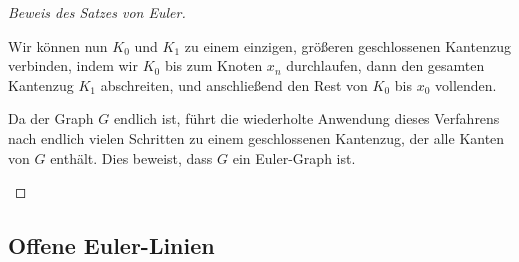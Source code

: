 \begin{proof}[Beweis des Satzes von Euler]
\begin{math-stroke}
Wir können nun $K_0$ und $K_1$ zu einem einzigen, größeren geschlossenen Kantenzug verbinden, indem wir $K_0$ bis zum Knoten $x_n$ durchlaufen, dann den gesamten Kantenzug $K_1$ abschreiten, und anschließend den Rest von $K_0$ bis $x_0$ vollenden.

\begin{center}
\end{center}

Da der Graph $G$ endlich ist, führt die wiederholte Anwendung dieses Verfahrens nach endlich vielen Schritten zu einem geschlossenen Kantenzug, der alle Kanten von $G$ enthält. Dies beweist, dass $G$ ein Euler-Graph ist.
\end{math-stroke}
\end{proof}

\begin{ai-global-state-checkpoint-invisible-content}
\end{ai-global-state-checkpoint-invisible-content}

\subsection{Offene Euler-Linien}

